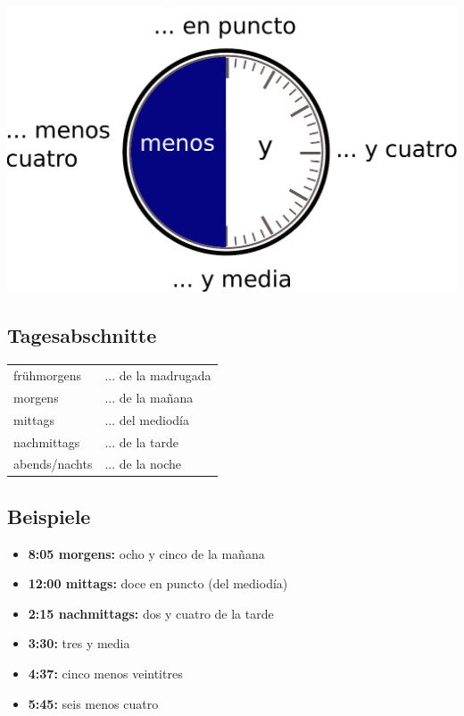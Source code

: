\documentclass[10pt,spanish]{report}
\begin{document}
\begin{center}
  \includegraphics[scale=0.5]{uhrzeit.pdf}
\end{center}

\subsection*{Tagesabschnitte}
\begin{longtable}{p{} p{}} 
  frühmorgens & ... de la madrugada \\
  morgens & ... de la ma\~{n}ana \\
  mittags & ... del mediodía \\
  nachmittags & ... de la tarde \\
  abends/nachts & ... de la noche
\end{longtable}

\subsection*{Beispiele}
\begin{itemize}
  \item \textbf{8:05 morgens:} ocho y cinco de la ma\~{n}ana 
  \item \textbf{12:00 mittags:} doce en puncto (del mediodía)
  \item \textbf{2:15 nachmittags:} dos y cuatro de la tarde
  \item \textbf{3:30:} tres y media
  \item \textbf{4:37:} cinco menos veintitres
  \item \textbf{5:45:} seis menos cuatro
\end{itemize}
\end{document}
